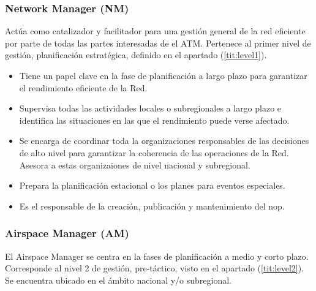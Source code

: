 \subsubsection{Network Manager (NM)}

Actúa como catalizador y facilitador para una gestión general de la red eficiente por parte de todas las partes interesadas de el ATM. Pertenece al primer nivel de gestión, planificación estratégica, definido en el apartado (\ref{tit:level1}).
    
\begin{itemize}
    \item Tiene un papel clave en la fase de planificación a largo plazo para garantizar el rendimiento eficiente de la Red.
    
    \item Supervisa todas las actividades locales o subregionales a largo plazo e identifica las situaciones en las que el rendimiento puede verse afectado.
    
    \item Se encarga de coordinar toda la organizaciones responsables de las decisiones de alto nivel para garantizar la coherencia de las operaciones de la Red. Asesora a estas organizaiones de nivel nacional y subregional.
    
    \item Prepara la planificación estacional o los planes para eventos especiales.
    
    \item Es el responsable de la creación, publicación y mantenimiento del \acrfull{nop}.
\end{itemize}

\subsubsection{Airspace Manager (AM)}

El Airspace Manager se centra en la fases de planificación a medio y corto plazo. Corresponde al nivel 2 de gestión, pre-táctico, visto en el apartado (\ref{tit:level2}). Se encuentra ubicado en el ámbito nacional y/o subregional. 

